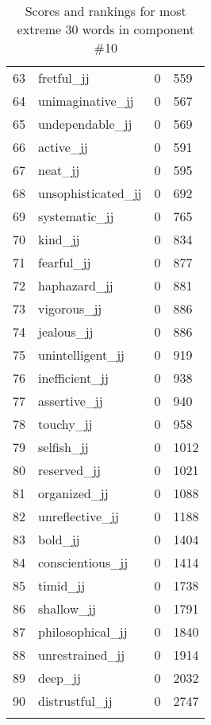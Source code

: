 \begin{longtable}[!htbp]{| rlr@{.}l |}
    63 & fretful\_jj & 0 & 559 \\
    64 & unimaginative\_jj & 0 & 567 \\
    65 & undependable\_jj & 0 & 569 \\
    66 & active\_jj & 0 & 591 \\
    67 & neat\_jj & 0 & 595 \\
    68 & unsophisticated\_jj & 0 & 692 \\
    69 & systematic\_jj & 0 & 765 \\
    70 & kind\_jj & 0 & 834 \\
    71 & fearful\_jj & 0 & 877 \\
    72 & haphazard\_jj & 0 & 881 \\
    73 & vigorous\_jj & 0 & 886 \\
    74 & jealous\_jj & 0 & 886 \\
    75 & unintelligent\_jj & 0 & 919 \\
    76 & inefficient\_jj & 0 & 938 \\
    77 & assertive\_jj & 0 & 940 \\
    78 & touchy\_jj & 0 & 958 \\
    79 & selfish\_jj & 0 & 1012 \\
    80 & reserved\_jj & 0 & 1021 \\
    81 & organized\_jj & 0 & 1088 \\
    82 & unreflective\_jj & 0 & 1188 \\
    83 & bold\_jj & 0 & 1404 \\
    84 & conscientious\_jj & 0 & 1414 \\
    85 & timid\_jj & 0 & 1738 \\
    86 & shallow\_jj & 0 & 1791 \\
    87 & philosophical\_jj & 0 & 1840 \\
    88 & unrestrained\_jj & 0 & 1914 \\
    89 & deep\_jj & 0 & 2032 \\
    90 & distrustful\_jj & 0 & 2747 \\
    \hline
    \caption{Scores and rankings for most extreme 30 words in component \#10} \\
\end{longtable}
